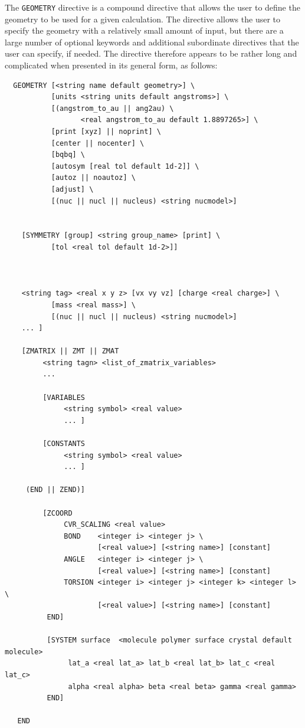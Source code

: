 %
%
\label{sec:geom}

The \verb+GEOMETRY+ directive is a compound directive that allows the
user to define the geometry to be used for a given calculation.  The
directive allows the user to specify the geometry with a relatively
small amount of input, but there are a large number of optional
keywords and additional subordinate directives that the user can
specify, if needed.  The directive therefore appears to be rather long
and complicated when presented in its general form, as follows:
\begin{verbatim}
  GEOMETRY [<string name default geometry>] \
           [units <string units default angstroms>] \
           [(angstrom_to_au || ang2au) \
                  <real angstrom_to_au default 1.8897265>] \
           [print [xyz] || noprint] \
           [center || nocenter] \
           [bqbq] \
           [autosym [real tol default 1d-2]] \
           [autoz || noautoz] \
           [adjust] \
           [(nuc || nucl || nucleus) <string nucmodel>]
           
    
    [SYMMETRY [group] <string group_name> [print] \
           [tol <real tol default 1d-2>]]



    <string tag> <real x y z> [vx vy vz] [charge <real charge>] \
           [mass <real mass>] \
           [(nuc || nucl || nucleus) <string nucmodel>]
    ... ]

    [ZMATRIX || ZMT || ZMAT
         <string tagn> <list_of_zmatrix_variables>
         ... 

         [VARIABLES
              <string symbol> <real value>
              ... ]
 
         [CONSTANTS
              <string symbol> <real value>
              ... ]

     (END || ZEND)]

         [ZCOORD
              CVR_SCALING <real value>
              BOND    <integer i> <integer j> \
                      [<real value>] [<string name>] [constant]
              ANGLE   <integer i> <integer j> \
                      [<real value>] [<string name>] [constant]
              TORSION <integer i> <integer j> <integer k> <integer l> \
                      [<real value>] [<string name>] [constant]
          END]
          
          [SYSTEM surface  <molecule polymer surface crystal default molecule>
               lat_a <real lat_a> lat_b <real lat_b> lat_c <real lat_c>
               alpha <real alpha> beta <real beta> gamma <real gamma>
          END]
 
   END


\end{verbatim}

